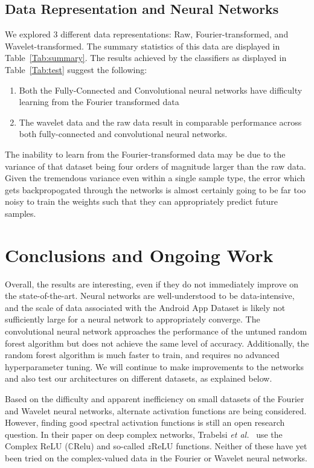 \documentclass[10pt]{article}
\begin{document}
\subsection{Data Representation and Neural Networks} \label{data representation}
We explored 3 different data representations: Raw, Fourier-transformed, and Wavelet-transformed.
The summary statistics of this data are displayed in Table~\ref{Tab:summary}.
The results achieved by the classifiers as displayed in Table~\ref{Tab:test} suggest the following:
\begin{enumerate}
\item Both the Fully-Connected and Convolutional neural networks have difficulty learning from the Fourier transformed data
\item The wavelet data and the raw data result in comparable performance across both fully-connected and convolutional neural networks.
\end{enumerate}

The inability to learn from the Fourier-transformed data may be due to the variance of that dataset being four orders of magnitude larger than the raw data.
Given the tremendous variance even within a single sample type, the error which gets backpropogated through the networks is almost certainly going to be far too noisy to train the weights such that they can appropriately predict future samples. 

\section{Conclusions and Ongoing Work}
Overall, the results are interesting, even if they do not immediately improve on the state-of-the-art. 
Neural networks are well-understood to be data-intensive, and the scale of data associated with the Android App Dataset is likely not sufficiently large for a neural network to appropriately converge. 
The convolutional neural network approaches the performance of the untuned random forest algorithm but does not achieve the same level of accuracy.
Additionally, the random forest algorithm is much faster to train, and requires no advanced hyperparameter tuning.
We will continue to make improvements to the networks and also test our architectures on different datasets, as explained below.

Based on the difficulty and apparent inefficiency on small datasets of the Fourier and Wavelet neural networks, alternate activation functions are being considered. 
However, finding good spectral activation functions is still an open research question.
In their paper on deep complex networks, Trabelsi \textit{et al.}~\cite{trabelsi2017deep} use the Complex ReLU ($\mathbb{C}$Relu) and so-called $z$ReLU functions. 
Neither of these have yet been tried on the complex-valued data in the Fourier or Wavelet neural networks.
\end{document}
